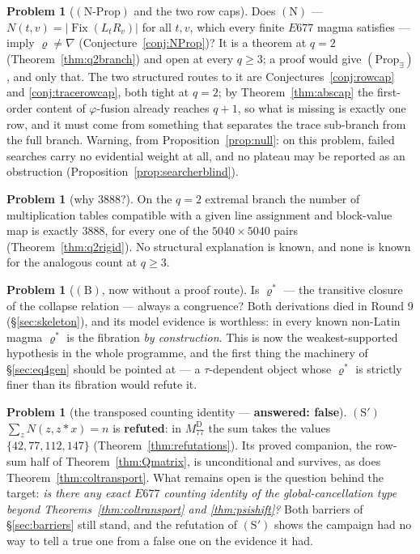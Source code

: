 \documentclass[11pt]{article}
\theoremstyle{plain}
\theoremstyle{definition}
\newtheorem{problem}[theorem]{Problem}
\theoremstyle{remark}
\numberwithin{equation}{section}
\newcommand{\op}{\mathbin{*}}
\newcommand{\Fix}{\operatorname{Fix}}
\begin{document}
\begin{problem}[$(\mathrm{N}\text{-}\mathrm{Prop})$ and the two row
caps]\label{prob:NProp}
Does $(\mathrm{N})$ --- $N(t,v) = |\Fix(L_tR_v)|$ for all $t,v$, which every
finite $E677$ magma satisfies --- imply $\varrho\ne\nabla$
(Conjecture~\ref{conj:NProp})? It is a theorem at $q = 2$
(Theorem~\ref{thm:q2branch}) and open at every $q\ge3$; a proof would give
$(\mathrm{Prop}_{\exists})$, and only that. The two structured routes to it are
Conjectures~\ref{conj:rowcap} and \ref{conj:tracerowcap}, both tight at $q = 2$;
by Theorem~\ref{thm:abscap} the first-order content of $\varphi$-fusion already
reaches $q+1$, so what is missing is exactly one row, and it must come from
something that separates the trace sub-branch from the full branch. Warning, from
Proposition~\ref{prop:null}: on this problem, failed searches carry no evidential
weight at all, and no plateau may be reported as an obstruction
(Proposition~\ref{prop:searcherblind}).
\end{problem}

\begin{problem}[why $3888$?]\label{prob:3888}
On the $q = 2$ extremal branch the number of multiplication tables compatible with
a given line assignment and block-value map is exactly $3888$, for every one of
the $5040\times5040$ pairs (Theorem~\ref{thm:q2rigid}). No structural explanation
is known, and none is known for the analogous count at $q\ge3$.
\end{problem}

\begin{problem}[$(\mathrm{B})$, now without a proof route]\label{prob:B}
Is $\varrho^{*}$ --- the transitive closure of the collapse relation --- always a
congruence? Both derivations died in Round 9
(\S\ref{sec:skeleton}), and its model evidence is worthless: in every known
non-Latin magma $\varrho^{*}$ is the fibration \emph{by construction}. This is now
the weakest-supported hypothesis in the whole programme, and the first thing the
machinery of \S\ref{sec:eq4gen} should be pointed at --- a $\tau$-dependent object
whose $\varrho^{*}$ is strictly finer than its fibration would refute it.
\end{problem}

\begin{problem}[the transposed counting identity --- \textbf{answered:
false}]\label{prob:Sprime}
$(\mathrm{S}')$ $\sum_zN(z,z\op x) = n$ is \textbf{refuted}: in
$M_{77}^{\mathrm{D}}$ the sum takes the values $\{42,77,112,147\}$
(Theorem~\ref{thm:refutations}). Its proved companion, the row-sum half of
Theorem~\ref{thm:Qmatrix}, is unconditional and survives, as does
Theorem~\ref{thm:coltransport}. What remains open is the question behind the
target: \emph{is there any exact $E677$ counting identity of the
global-cancellation type beyond Theorems~\ref{thm:coltransport} and
\ref{thm:psishift}?} Both barriers of \S\ref{sec:barriers} still stand, and the
refutation of $(\mathrm{S}')$ shows the campaign had no way to tell a true one
from a false one on the evidence it had.
\end{problem}
\end{document}
